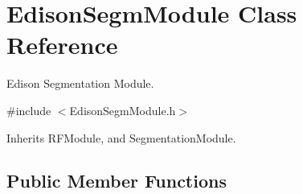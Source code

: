 \section{Edison\+Segm\+Module Class Reference}
\label{classEdisonSegmModule}


Edison Segmentation Module.  




{\ttfamily \#include $<$Edison\+Segm\+Module.\+h$>$}



Inherits R\+F\+Module, and Segmentation\+Module.

\subsection*{Public Member Functions}
